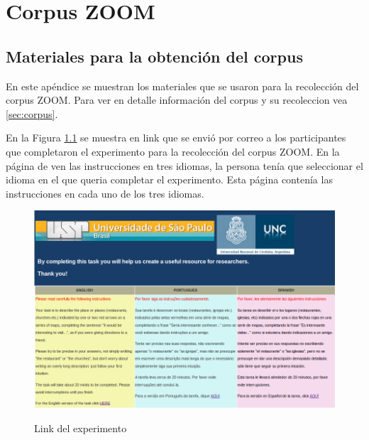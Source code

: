 \appendix

\chapter{Corpus ZOOM}

\section{Materiales para la obtenci\'on del corpus}
\label{corpus-apendice}

En este ap\'endice se muestran los materiales que se usaron para la recolecci\'on del corpus ZOOM. Para ver en detalle informaci\'on del corpus y su recoleccion vea \ref{sec:corpus}.

En la Figura \ref{fig-pagPrincipal} se muestra en link que se envi\'o por correo a los participantes que completaron el experimento para la recolecci\'on del corpus ZOOM. En la p\'agina de ven las instrucciones en tres idiomas, la persona ten\'ia que seleccionar el idioma en el que queria completar el experimento. Esta p\'agina conten\'ia las instrucciones en cada uno de los tres idiomas.

%

\begin{figure}[ht]
\begin{center}
\includegraphics[width=13cm]{images/pagPrincipal.png}\\[0pt]
\caption{Link del experimento}
\label{fig-pagPrincipal}
\end{center}
\end{figure}

